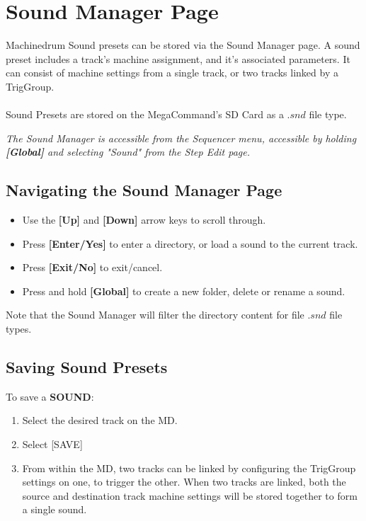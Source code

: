 \chapter{Sound Manager Page}
Machinedrum Sound presets can be stored via the Sound Manager page.  A sound preset includes a track's machine assignment, and it's associated parameters. It can consist of machine settings from a single track, or two tracks linked by a TrigGroup.\\
\\
Sound Presets are stored on the MegaCommand's SD Card as a $.snd$ file type.

\textit{The Sound Manager is accessible from the Sequencer menu, accessible by holding \textbf{[Global]} and selecting "Sound" from the Step Edit page.}

\section{Navigating the Sound Manager Page}
\begin{itemize}
    \item Use the \textbf{[Up]} and \textbf{[Down]} arrow keys to scroll through.
    \item Press \textbf{[Enter/Yes]} to enter a directory, or load a sound to the current track.
    \item Press \textbf{[Exit/No]} to exit/cancel.
    \item Press and hold \textbf{[Global]} to create a new folder, delete or rename a sound.
\end{itemize}

Note that the Sound Manager will filter the directory content for file $.snd$ file types.
\newpage
\section{Saving Sound Presets}
To save a \textbf{SOUND}:
\begin{enumerate}
 \item Select the desired track on the MD.
 \item Select [SAVE]
 \item From within the MD, two tracks can be linked by configuring the TrigGroup settings on one, to trigger the other. When two tracks are linked, both the source and destination track machine settings will be stored together to form a single sound.
\end{enumerate}
